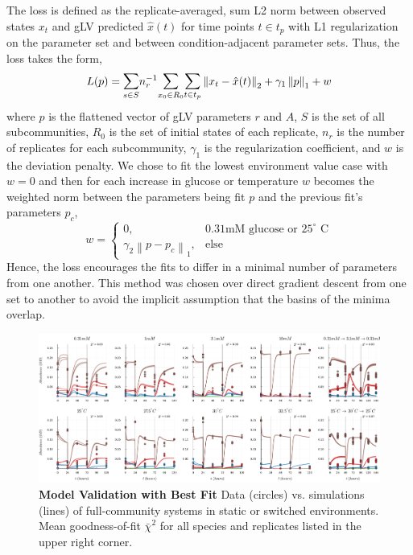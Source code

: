 \documentclass[twocolumn, 10pt]{report}
\begin{document}
{The loss is defined as the replicate-averaged, sum L2 norm between observed states $x_t$ and gLV predicted $\hat{x}(t)$ for time points $t \in t_p$ with L1 regularization on the parameter set and between condition-adjacent parameter sets. Thus, the loss takes the form,
\begin{equation} \label{loss_global}
    L(p) = \mathlarger{\sum}_{s \in S} n_r^{-1}
    \mathlarger{\sum}_{x_0 \in R_0}
    \mathlarger{\sum}_{t \in t_p}
    \left\lVert x_t - \hat{x}(t) \right\rVert_2 
    + \gamma_1 \left\lVert p \right\rVert_1
    + w
\end{equation}
where $p$ is the flattened vector of gLV parameters $r$ and $A$, $S$ is the set of all subcommunities, $R_0$ is the set of initial states of each replicate, $n_r$ is the number of replicates for each subcommunity, $\gamma_1$ is the regularization coefficient, and $w$ is the deviation penalty. We chose to fit the lowest environment value case with $w = 0$ and then for each increase in glucose or temperature $w$ becomes the weighted norm between the parameters being fit $p$ and the previous fit's parameters $p_c$,
\begin{equation} \label{deviation_penalty}
    w = \begin{cases}
        0, & \text{0.31mM glucose or $25 ^{\circ}$ C} \\
        \gamma_2 \left\lVert p - p_c \right\rVert_1, & \text{else}
      \end{cases}
\end{equation}
\noindent Hence, the loss encourages the fits to differ in a minimal number of parameters from one another. This method was chosen over direct gradient descent from one set to another to avoid the implicit assumption that the basins of the minima overlap.

\begin{figure}[!ht]
    \centering
    \includegraphics[width=2.0\columnwidth]{figs/model_validation.pdf}
    \centering
    \caption{\textbf{Model Validation with Best Fit} Data (circles) vs. simulations (lines) of full-community systems in static or switched environments. Mean goodness-of-fit $\bar{\chi}^2$ for all species and replicates listed in the upper right corner.}\label{fig:mv}
\end{figure}

}
\end{document}
